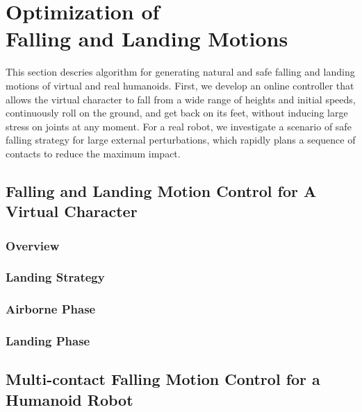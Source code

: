 \chapter{Optimization of \protect\\ Falling and Landing Motions}

This section descries algorithm for generating natural and safe
falling and landing motions of virtual and real humanoids.
First, we develop an online controller that 
allows the virtual character to fall from a wide range of heights
and initial speeds, continuously roll on the ground, and get back
on its feet, without inducing large stress on joints at any moment.
For a real robot, we investigate a scenario of safe falling 
strategy for large external perturbations, which rapidly
plans a sequence of contacts to reduce the maximum impact.

\section{Falling and Landing Motion Control for A Virtual Character}

\subsection{Overview}

\subsection{Landing Strategy}

\subsection{Airborne Phase}

\subsection{Landing Phase}

\section{Multi-contact Falling Motion Control for a Humanoid Robot}
